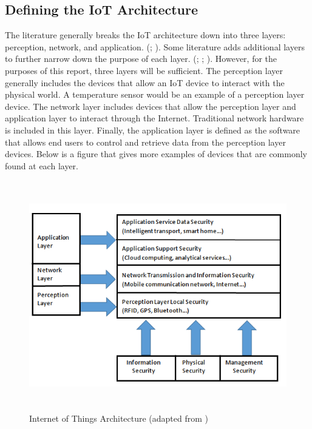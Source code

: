 \documentclass[letterpaper, 12pt]{article}
\begin{document}
\begin{flushleft}
\subsection*{Defining the IoT Architecture}
The literature generally breaks the IoT architecture down into three layers: perception, network, and application. (\cite{Zhao6746513}; \cite{Xiaohui6643029}). Some literature adds additional layers to further narrow down the purpose of each
layer. (\cite{Granjal7005393}; \cite{Kozlov}; \cite{Suo6188257}). However, for the purposes of this report, three layers will be sufficient. The perception layer 
generally includes the devices that allow an IoT device to interact with the physical world. A temperature sensor would be an example of a
perception layer device. The network layer includes devices that allow the perception layer and application layer to interact through the Internet.
Traditional network hardware is included in this layer. Finally, the application layer is defined as the software that allows end users to control
and retrieve data from the perception layer devices. Below is a figure that gives more examples of devices that are commonly found at each layer.

\begin{figure}[H]
	\includegraphics[width=\linewidth,height=10cm,keepaspectratio]{figure2_new.png}
	\caption{Internet of Things Architecture (adapted from \cite{Zhao6746513})}
	\label{fig:arch}
\end{figure}


\end{flushleft}
\end{document}
